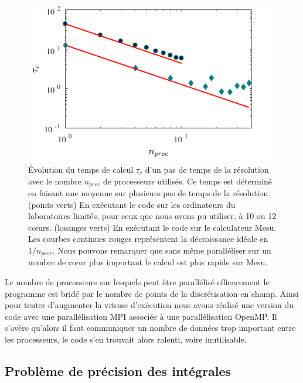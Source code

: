 \documentclass[10.5pt]{article}
\begin{document}
\begin{multicols}{2}
\begin{figure}[H]
\begin{center}
	\includegraphics[width=0.95\columnwidth]{Scalabilite.pdf}
\end{center}
\caption{Évolution du temps de calcul $\tau_c$ d'un pas de temps de la résolution avec le nombre $n_{proc}$ de processeurs utilisés. Ce temps est déterminé en faisant une moyenne sur  plusieurs pas de temps de la résolution. (points verts) En exécutant le code sur les ordinateurs du laboratoires limités, pour ceux que nous avons pu utiliser, à 10 ou 12 cœurs. (losanges verts) En exécutant le code sur le calculateur Mesu. Les courbes continues rouges représentent la décroissance idéale en $1/n_{proc}$. Nous pouvons remarquer que sans même paralléliser sur un nombre de cœur plus important le calcul est plus rapide sur Mesu.}
\label{fig:timeScal}
\end{figure}


Le nombre de processeurs sur lesquels peut être parallélisé efficacement le programme est bridé par le nombre de points de la discrétisation en champ. Ainsi pour tenter d'augmenter la vitesse d'exécution nous avons réalisé une version du code avec une parallélisation MPI \cite{open2012open} associée à une parallélisation OpenMP. Il s'avère qu'alors il faut communiquer un nombre de données trop important entre les processeurs, le code s'en trouvait alors ralenti, voire inutilisable. \\







\subsection{Problème de précision des intégrales}



\end{multicols}
\end{document}
